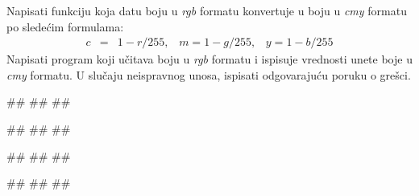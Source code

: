  
\begin{Exercise}[label=POK_02] 
  Napisati funkciju  koja datu boju u \textit{rgb} 
  formatu konvertuje u boju u \textit{cmy} formatu po sledećim formulama:
\begin{eqnarray*}
  c &=& 1 - r / 255,\;\;\;  m = 1 - g / 255, \;\;\; y = 1 - b / 255 
\end{eqnarray*}
Napisati program koji učitava boju u \textit{rgb} formatu i ispisuje vrednosti unete boje u \textit{cmy} formatu. U slučaju neispravnog unosa, ispisati odgovarajuću poruku o grešci. 
\\

\begin{miditest}
\begin{upotreba}{1}
#\naslovInt#
##
##
\end{upotreba}
\end{miditest}
\begin{miditest}
\begin{upotreba}{2}
#\naslovInt#
##
##
\end{upotreba}
\end{miditest}

\begin{miditest}
\begin{upotreba}{3}
#\naslovInt#
##
##
\end{upotreba}
\end{miditest}
\begin{miditest}
\begin{upotreba}{4}
#\naslovInt#
##
##
\end{upotreba}
\end{miditest}

\end{Exercise}
\ifresenja
\begin{Answer}[ref=POK_02]
\end{Answer}
 \fi

